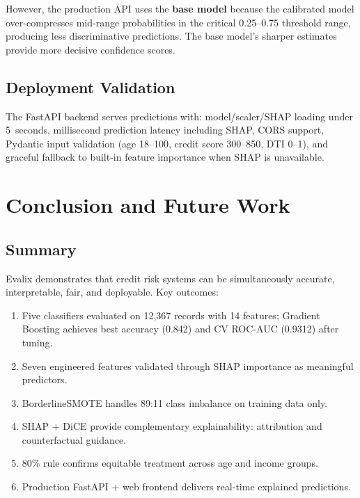 \documentclass[journal]{IEEEtran}
\begin{document}
However, the production API uses the \textbf{base model} because the calibrated model over-compresses mid-range probabilities in the critical 0.25--0.75 threshold range, producing less discriminative predictions. The base model's sharper estimates provide more decisive confidence scores.


\subsection{Deployment Validation}

The FastAPI backend serves predictions with: model/scaler/SHAP loading under 5~seconds, millisecond prediction latency including SHAP, CORS support, Pydantic input validation (age 18--100, credit score 300--850, DTI 0--1), and graceful fallback to built-in feature importance when SHAP is unavailable.


\section{Conclusion and Future Work}

\subsection{Summary}

Evalix demonstrates that credit risk systems can be simultaneously accurate, interpretable, fair, and deployable. Key outcomes:

\begin{enumerate}[nosep]
  \item Five classifiers evaluated on 12,367 records with 14 features; Gradient Boosting achieves best accuracy (0.842) and CV ROC-AUC (0.9312) after tuning.
  \item Seven engineered features validated through SHAP importance as meaningful predictors.
  \item BorderlineSMOTE handles 89:11 class imbalance on training data only.
  \item SHAP + DiCE provide complementary explainability: attribution and counterfactual guidance.
  \item 80\% rule confirms equitable treatment across age and income groups.
  \item Production FastAPI + web frontend delivers real-time explained predictions.
\end{enumerate}
\end{document}
